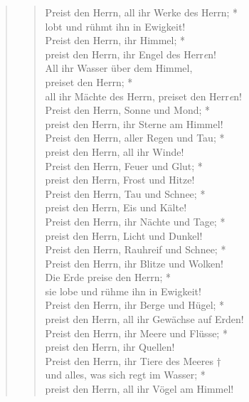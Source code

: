 \vspace{0.3cm}



\begin{quote}
\begin{verse}

Preist den Herrn, all ihr Werke des Herrn; *\\
lobt und rühmt ihn in Ewigkeit!\\
\vin Preist den Herrn, ihr Himmel; *\\
\vin preist den Herrn, ihr Engel des Herr\textit{e}n!\\
All ihr Wasser über dem Himmel,\\
preiset den Herrn; *\\
all ihr Mächte des Herrn, preiset den Herr\textit{e}n!\\
\vin Preist den Herrn, Sonne und Mond; *\\
\vin preist den Herrn, ihr Sterne am Himmel!\\
Preist den Herrn, aller Regen und Tau; *\\
preist den Herrn, all ihr Winde!\\
\vin Preist den Herrn, Feuer und Glut; *\\
\vin preist den Herrn, Frost und Hitze!\\
Preist den Herrn, Tau und Schnee; *\\
preist den Herrn, Eis und Kälte!\\
\vin Preist den Herrn, ihr Nächte und Tage; *\\
\vin preist den Herrn, Licht und Dunkel!\\
Preist den Herrn, Rauhreif und Schnee; *\\
Preist den Herrn, ihr Blitze und Wolken!\\
\vin Die Erde preise den Herrn; *\\
\vin sie lobe und rühme ihn in Ewigkeit!\\
Preist den Herrn, ihr Berge und Hügel; *\\
preist den Herrn, all ihr Gewächse auf Erden!\\
\vin Preist den Herrn, ihr Meere und Flüsse; *\\
\vin preist den Herrn, ihr Quellen!\\
Preist den Herrn, ihr Tiere des Meeres †\\
und alles, was sich regt im Wasser; *\\
preist den Herrn, all ihr Vögel am Himmel!\\

\end{verse}
\end{quote}
